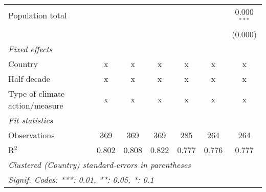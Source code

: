 \begin{tabular}{lcccccc}
   Population total                                           &         &               &                &                &                & 0.000$^{***}$\\   
                                                              &         &               &                &                &                & (0.000)\\   
   \emph{Fixed effects}\\
   Country                                                    & x       & x             & x              & x              & x              & x\\  
   Half decade                                                & x       & x             & x              & x              & x              & x\\  
   Type of climate action/measure                             & x       & x             & x              & x              & x              & x\\  
   \midrule \emph{Fit statistics}\\
   Observations                                               & 369     & 369           & 369            & 285            & 264            & 264\\  
   R$^2$                                                      & 0.802   & 0.808         & 0.822          & 0.777          & 0.776          & 0.777\\  
   \midrule
   \multicolumn{7}{l}{\emph{Clustered (Country) standard-errors in parentheses}}\\
   \multicolumn{7}{l}{\emph{Signif. Codes: ***: 0.01, **: 0.05, *: 0.1}}\\
\end{tabular}
\par\endgroup


